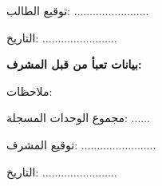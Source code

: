\documentclass[fontsize=14,headinclude=true, headsepline=true,
footsepline=true]{scrartcl}
\begin{document}
\vspace{0.2cm}

\begin{minipage}[t]{0.5\textwidth}
\flushright
توقيع الطالب: $\ldots\ldots\ldots\ldots\ldots\ldots\ldots\dots$
  \end{minipage}
\hfill
\begin{minipage}[t]{0.5\textwidth}
\flushleft
التاريخ: $\ldots\ldots\ldots\ldots\ldots\ldots\ldots\dots$
\end{minipage}
\vfill

\textbf{بيانات تعبأ من قبل المشرف:}


ملاحظات:

\fbox{
  \begin{minipage}{\textwidth}
    \hfill\vspace{2.5cm}
  \end{minipage}
}
\vspace{0.3cm}

مجموع الوحدات المسجلة: $\ldots\ldots$

\vspace{0.3cm}

\begin{minipage}[t]{0.5\textwidth}
\flushright
توقيع المشرف: $\ldots\ldots\ldots\ldots\ldots\ldots\ldots\dots$
  \end{minipage}
\hfill
\begin{minipage}[t]{0.5\textwidth}
\flushleft
التاريخ: $\ldots\ldots\ldots\ldots\ldots\ldots\ldots\dots$
\end{minipage}
\end{document}
